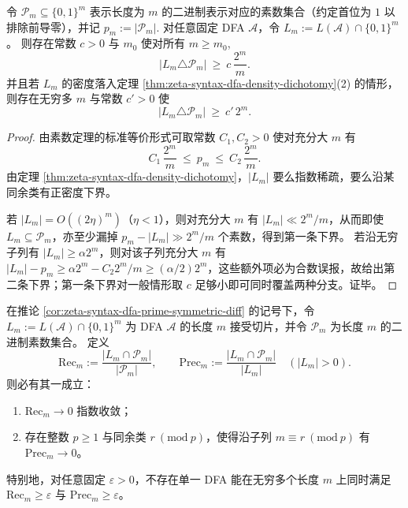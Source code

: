 \begin{corollary}[有限自动机无法精确识别二进制素数集合]\label{cor:zeta-syntax-dfa-prime-symmetric-diff}
令 \(\mathcal P_m\subseteq\{0,1\}^m\) 表示长度为 \(m\) 的二进制表示对应的素数集合（约定首位为 \(1\) 以排除前导零），并记
\(
p_m:=|\mathcal P_m|.
\)
对任意固定 DFA \(\mathcal A\)，令 \(L_m:=L(\mathcal A)\cap\{0,1\}^m\)。
则存在常数 \(c>0\) 与 \(m_0\) 使对所有 \(m\ge m_0\),
\[
|L_m\triangle \mathcal P_m|\ \ge\ c\,\frac{2^m}{m}.
\]
并且若 \(L_m\) 的密度落入定理 \ref{thm:zeta-syntax-dfa-density-dichotomy}(2) 的情形，则存在无穷多 \(m\) 与常数 \(c'>0\) 使
\[
|L_m\triangle \mathcal P_m|\ \ge\ c'\,2^m.
\]
\end{corollary}
\begin{proof}
由素数定理的标准等价形式可取常数 \(C_1,C_2>0\) 使对充分大 \(m\) 有
\[
C_1\,\frac{2^m}{m}\ \le\ p_m\ \le\ C_2\,\frac{2^m}{m}.
\]
由定理 \ref{thm:zeta-syntax-dfa-density-dichotomy}，\(|L_m|\) 要么指数稀疏，要么沿某同余类有正密度下界。
\par
若 \(|L_m|=O((2\eta)^m)\)（\(\eta<1\)），则对充分大 \(m\) 有 \(|L_m|\ll 2^m/m\)，从而即使 \(L_m\subseteq\mathcal P_m\)，亦至少漏掉 \(p_m-|L_m|\gg 2^m/m\) 个素数，得到第一条下界。
若沿无穷子列有 \(|L_m|\ge \alpha 2^m\)，则对该子列充分大 \(m\) 有
\(
|L_m|-p_m\ge \alpha 2^m-C_2 2^m/m\ge (\alpha/2)2^m
\)，这些额外项必为合数误报，故给出第二条下界；第一条下界对一般情形取 \(c\) 足够小即可同时覆盖两种分支。证毕。
\end{proof}

\begin{corollary}\label{cor:zeta-syntax-dfa-prime-recall-precision-collapse}
在推论 \ref{cor:zeta-syntax-dfa-prime-symmetric-diff} 的记号下，令 \(L_m:=L(\mathcal A)\cap\{0,1\}^m\) 为 DFA \(\mathcal A\) 的长度 \(m\) 接受切片，并令 \(\mathcal P_m\) 为长度 \(m\) 的二进制素数集合。
定义
\[
\mathrm{Rec}_m:=\frac{|L_m\cap \mathcal P_m|}{|\mathcal P_m|},
\qquad
\mathrm{Prec}_m:=\frac{|L_m\cap \mathcal P_m|}{|L_m|}
\quad(|L_m|>0).
\]
则必有其一成立：
\begin{enumerate}
  \item \(\mathrm{Rec}_m\to 0\) 指数收敛；
  \item 存在整数 \(p\ge 1\) 与同余类 \(r\ (\mathrm{mod}\ p)\)，使得沿子列 \(m\equiv r\ (\mathrm{mod}\ p)\) 有 \(\mathrm{Prec}_m\to 0\)。
\end{enumerate}
特别地，对任意固定 \(\varepsilon>0\)，不存在单一 DFA 能在无穷多个长度 \(m\) 上同时满足 \(\mathrm{Rec}_m\ge \varepsilon\) 与 \(\mathrm{Prec}_m\ge \varepsilon\)。
\end{corollary}

